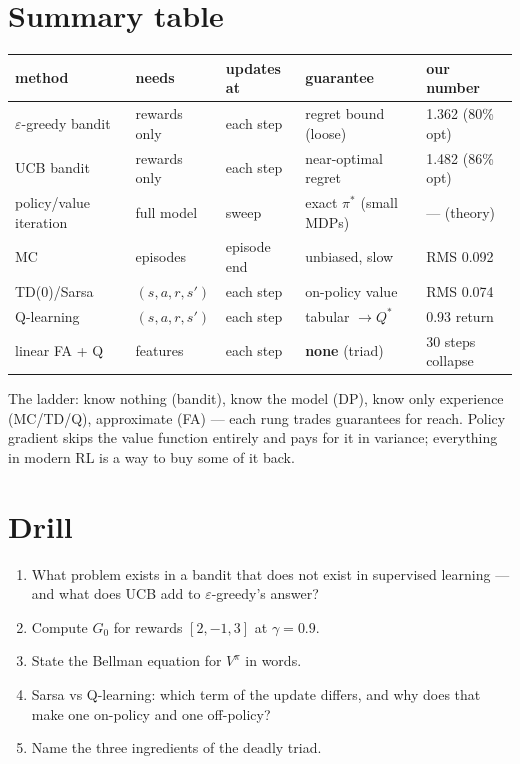\section{Summary table}
\label{sec:rlsummary}

\begin{center}\small
\begin{tabular}{p{2.4cm}p{3.0cm}p{2.6cm}p{2.6cm}p{2.2cm}}
\toprule
method & needs & updates at & guarantee & our number \\
\midrule
$\varepsilon$-greedy bandit & rewards only & each step & regret bound (loose) & 1.362 (80\% opt) \\
UCB bandit & rewards only & each step & near-optimal regret & 1.482 (86\% opt) \\
policy/value iteration & full model & sweep & exact $\pi^*$ (small MDPs) & --- (theory) \\
MC & episodes & episode end & unbiased, slow & RMS 0.092 \\
TD(0)/Sarsa & $(s,a,r,s')$ & each step & on-policy value & RMS 0.074 \\
Q-learning & $(s,a,r,s')$ & each step & tabular $\to Q^*$ & 0.93 return \\
linear FA + Q & features & each step & \textbf{none} (triad) & 30 steps collapse \\
\bottomrule
\end{tabular}
\end{center}

The ladder: know nothing (bandit), know the model (DP), know only
experience (MC/TD/Q), approximate (FA) --- each rung trades guarantees
for reach. Policy gradient skips the value function entirely and pays
for it in variance; everything in modern RL is a way to buy some of
it back.

\section*{Drill}
\begin{enumerate}
\item What problem exists in a bandit that does not exist in
supervised learning --- and what does UCB add to $\varepsilon$-greedy's
answer?
\item Compute $G_0$ for rewards $[2,-1,3]$ at $\gamma{=}0.9$.
\item State the Bellman equation for $V^\pi$ in words.
\item Sarsa vs Q-learning: which term of the update differs, and why
does that make one on-policy and one off-policy?
\item Name the three ingredients of the deadly triad.
\end{enumerate}

